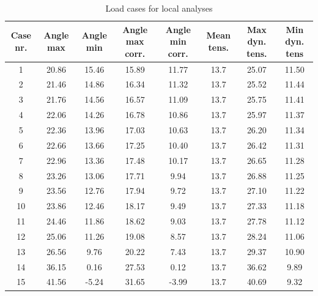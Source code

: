 \begin{table}
\begin{tabular}{ |c|c|c|c|c|c|c|c|}
\hline
	Case nr. & Angle max & Angle min &  Angle max corr. & Angle min corr. & Mean tens. & Max dyn. tens.  & Min dyn. tens   \\
 \hline
 \hline
	1 & 20.86 & 15.46 & 15.89 & 11.77 & 13.7 & 25.07 & 11.50   \\ 
	2 & 21.46 & 14.86 & 16.34 & 11.32 & 13.7 & 25.52 & 11.44   \\
	3 & 21.76 & 14.56 & 16.57 & 11.09 & 13.7 & 25.75 & 11.41   \\ 
	4 & 22.06 & 14.26 & 16.78 & 10.86 & 13.7 & 25.97 & 11.37  \\ 
	5 & 22.36 & 13.96 & 17.03 & 10.63 & 13.7 & 26.20 & 11.34  \\ 
	6 & 22.66 & 13.66 & 17.25 & 10.40 & 13.7 & 26.42 & 11.31  \\ 
	7 & 22.96 & 13.36 & 17.48 & 10.17 & 13.7 & 26.65 & 11.28   \\ 
	8 & 23.26 & 13.06 & 17.71 & 9.94 & 13.7 & 26.88 & 11.25  \\ 
	9 & 23.56 & 12.76 & 17.94 & 9.72 & 13.7 & 27.10 & 11.22  \\ 
	10 & 23.86 & 12.46 & 18.17 & 9.49 & 13.7 & 27.33 & 11.18  \\ 
	11 & 24.46 & 11.86 & 18.62 & 9.03 & 13.7 & 27.78 & 11.12  \\ 
	12 & 25.06 & 11.26 & 19.08 & 8.57 & 13.7 & 28.24 & 11.06  \\ 
	13 & 26.56 & 9.76 & 20.22 & 7.43 & 13.7 & 29.37 & 10.90  \\ 
	14 & 36.15 & 0.16 & 27.53 & 0.12 & 13.7 & 36.62 & 9.89  \\ 
	15 & 41.56 & -5.24 & 31.65 & -3.99 & 13.7 & 40.69 & 9.32 \\ 
 \hline
\end{tabular}
\caption{Load cases for local analyses}
\label{table:cases}
\end{table}





